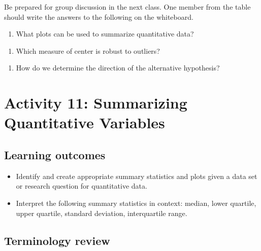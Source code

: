 \documentclass[
]{report}
\providecommand{\tightlist}{%
  \setlength{\itemsep}{0pt}\setlength{\parskip}{0pt}}
\begin{document}
Be prepared for group discussion in the next class. One member from the table should write the answers to the following on the whiteboard.

\begin{enumerate}
\def\labelenumi{\arabic{enumi}.}
\tightlist
\item
  What plots can be used to summarize quantitative data?
\end{enumerate}

\vspace{0.7in}

\begin{enumerate}
\def\labelenumi{\arabic{enumi}.}
\setcounter{enumi}{1}
\tightlist
\item
  Which measure of center is robust to outliers?
\end{enumerate}

\vspace{0.2in}

\begin{enumerate}
\def\labelenumi{\arabic{enumi}.}
\setcounter{enumi}{2}
\tightlist
\item
  How do we determine the direction of the alternative hypothesis?
\end{enumerate}

\newpage

\section{Activity 11: Summarizing Quantitative Variables}\label{activity-11-summarizing-quantitative-variables}


\subsection{Learning outcomes}\label{learning-outcomes}

\begin{itemize}
\item
  Identify and create appropriate summary statistics and plots given a data set or research question for quantitative data.
\item
  Interpret the following summary statistics in context:
  median, lower quartile, upper quartile,
  standard deviation, interquartile range.
\end{itemize}

\subsection{Terminology review}\label{terminology-review}
\end{document}
